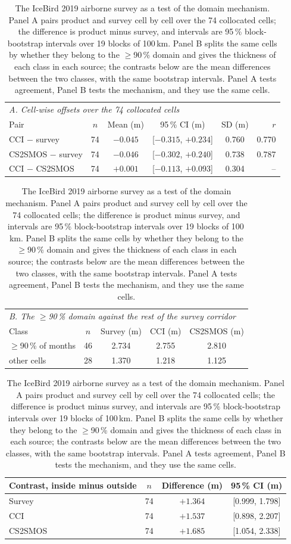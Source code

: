 ﻿\begin{table}[htbp]
\centering
\caption{The IceBird 2019 airborne survey as a test of the domain mechanism.
Panel A pairs product and survey cell by cell over the 74 collocated cells;
the difference is product minus survey, and intervals are 95\,\%
block-bootstrap intervals over 19 blocks of 100\,km. Panel B splits the same
cells by whether they belong to the $\ge$90\,\% domain and gives the thickness
of each class in each source; the contrasts below are the mean differences
between the two classes, with the same bootstrap intervals. Panel A tests
agreement, Panel B tests the mechanism, and they use the same cells.}
\label{tab:icebird}
\footnotesize
\setlength{\tabcolsep}{4pt}
\begin{tabular}{lccccr}
\toprule
\multicolumn{6}{l}{\textit{A. Cell-wise offsets over the 74 collocated cells}} \\
Pair & $n$ & Mean (m) & 95\,\% CI (m) & SD (m) & $r$ \\
\midrule
CCI $-$ survey & 74 & $-0.045$ & [$-0.315$, $+0.234$] & 0.760 & 0.770 \\
CS2SMOS $-$ survey & 74 & $-0.046$ & [$-0.302$, $+0.240$] & 0.738 & 0.787 \\
CCI $-$ CS2SMOS & 74 & $+0.001$ & [$-0.113$, $+0.093$] & 0.304 & -- \\
\bottomrule
\end{tabular}

\vspace{6pt}
\begin{tabular}{lcccc}
\toprule
\multicolumn{5}{l}{\textit{B. The $\ge$90\,\% domain against the rest of the survey corridor}} \\
Class & $n$ & Survey (m) & CCI (m) & CS2SMOS (m) \\
\midrule
$\ge$90\,\% of months & 46 & 2.734 & 2.755 & 2.810 \\
other cells & 28 & 1.370 & 1.218 & 1.125 \\
\bottomrule
\end{tabular}

\vspace{6pt}
\begin{tabular}{lccc}
\toprule
Contrast, inside minus outside & $n$ & Difference (m) & 95\,\% CI (m) \\
\midrule
Survey & 74 & $+1.364$ & [0.999, 1.798] \\
CCI & 74 & $+1.537$ & [0.898, 2.207] \\
CS2SMOS & 74 & $+1.685$ & [1.054, 2.338] \\
\bottomrule
\end{tabular}
\end{table}
